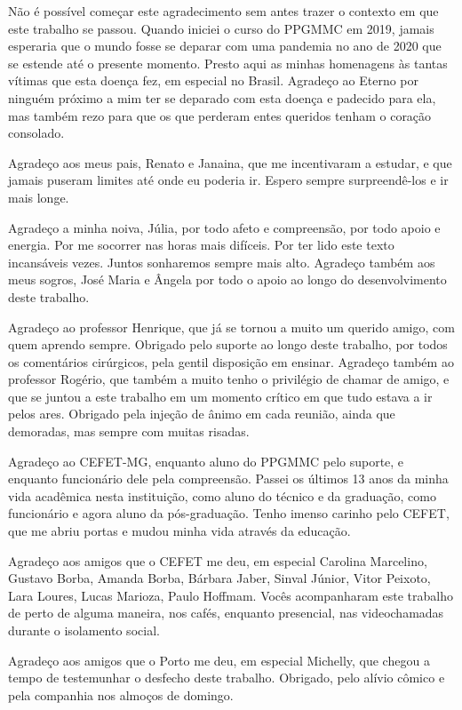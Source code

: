 \begin{agradecimentos}
Não é possível começar este agradecimento sem antes trazer o contexto em que este trabalho se passou. Quando iniciei o curso do PPGMMC em 2019, jamais esperaria que o mundo fosse se deparar com uma pandemia no ano de 2020 que se estende até o presente momento. Presto aqui as minhas homenagens às tantas vítimas que esta doença fez, em especial no Brasil. Agradeço ao Eterno por ninguém próximo a mim ter se deparado com esta doença e padecido para ela, mas também rezo para que os que perderam entes queridos tenham o coração consolado.

Agradeço aos meus pais, Renato e Janaina, que me incentivaram a estudar, e que jamais puseram limites até onde eu poderia ir. Espero sempre surpreendê-los e ir mais longe.

Agradeço a minha noiva, Júlia, por todo afeto e compreensão, por todo apoio e energia. Por me socorrer nas horas mais difíceis. Por ter lido este texto incansáveis vezes. Juntos sonharemos sempre mais alto. Agradeço também aos meus sogros, José Maria  e Ângela por todo o apoio ao longo do desenvolvimento deste trabalho.

Agradeço ao professor Henrique, que já se tornou a muito um querido amigo, com quem aprendo sempre. Obrigado pelo suporte ao longo deste trabalho, por todos os comentários cirúrgicos, pela gentil disposição em ensinar. Agradeço também ao professor Rogério, que também a muito tenho o privilégio de chamar de amigo, e que se juntou a este trabalho em um momento crítico em que tudo estava a ir pelos ares. Obrigado pela injeção de ânimo em cada reunião, ainda que demoradas, mas sempre com muitas risadas. 

Agradeço ao CEFET-MG, enquanto aluno do PPGMMC pelo suporte, e enquanto funcionário dele pela compreensão. Passei os últimos 13 anos da minha vida acadêmica nesta instituição, como aluno do técnico e da graduação, como funcionário e agora aluno da pós-graduação. Tenho imenso carinho pelo CEFET, que me abriu portas e mudou minha vida através da educação. 

Agradeço aos amigos que o CEFET me deu, em especial Carolina Marcelino,  Gustavo Borba, Amanda Borba, Bárbara Jaber, Sinval Júnior, Vitor Peixoto, Lara Loures, Lucas Marioza, Paulo Hoffmam. Vocês acompanharam este trabalho de perto de alguma maneira, nos cafés, enquanto presencial, nas videochamadas durante o isolamento social.

Agradeço aos amigos que o Porto me deu, em especial Michelly, que chegou a tempo de testemunhar o desfecho deste trabalho. Obrigado, pelo alívio cômico e pela companhia nos almoços de domingo.

\end{agradecimentos}